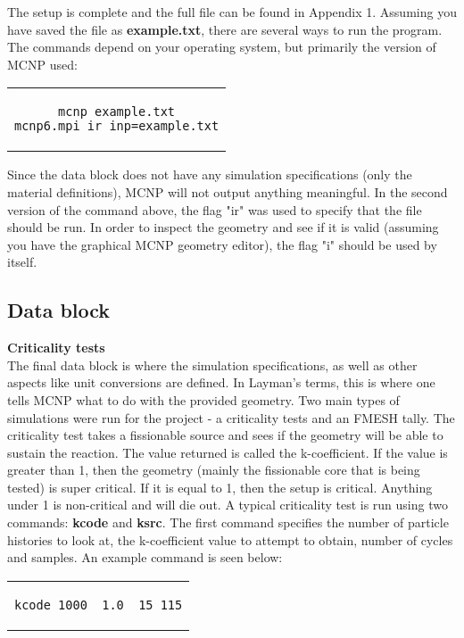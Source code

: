 The setup is complete and the full file can be found in Appendix 1. Assuming you have saved the file as \textbf{example.txt}, there are several ways to run the program. The commands depend on your operating system, but primarily the version of MCNP used:

\begin{center}
\begin{tabular}{c}
\begin{lstlisting}
mcnp example.txt
mcnp6.mpi ir inp=example.txt
\end{lstlisting}
\end{tabular}
\end{center}

Since the data block does not have any simulation specifications (only the material definitions), MCNP will not output anything meaningful. In the second version of the command above, the flag "ir" was used to specify that the file should be run. In order to inspect the geometry and see if it is valid (assuming you have the graphical MCNP geometry editor), the flag "i" should be used by itself.

\label{sec:simulations}
\subsection{Data block}

\textbf{Criticality tests}\\

The final data block is where the simulation specifications, as well as other aspects like unit conversions are defined. In Layman's terms, this is where one tells MCNP what to do with the provided geometry. Two main types of simulations were run for the project - a criticality tests and an FMESH tally. The criticality test takes a fissionable source and sees if the geometry will be able to sustain the reaction. The value returned is called the k-coefficient. If the value is greater than 1, then the geometry (mainly the fissionable core that is being tested) is super critical. If it is equal to 1, then the setup is critical. Anything under 1 is non-critical and will die out. A typical criticality test is run using two commands: \textbf{kcode} and \textbf{ksrc}. The first command specifies the number of particle histories to look at, the k-coefficient value to attempt to obtain, number of cycles and samples. An example command is seen below:

\begin{center}
\begin{tabular}{c}
\begin{lstlisting}
kcode 1000  1.0  15 115
\end{lstlisting}
\end{tabular}
\end{center}

